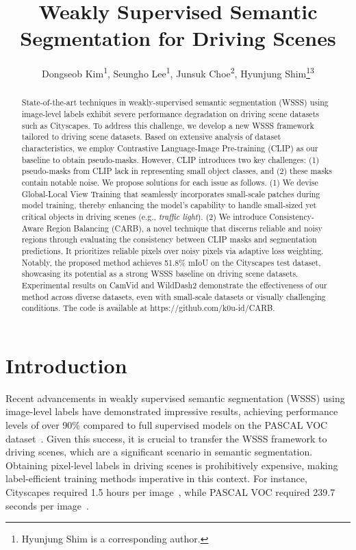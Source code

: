\documentclass[letterpaper]{article} %
\title{Weakly Supervised Semantic Segmentation for Driving Scenes}
\author{
    Dongseob Kim\equalcontrib\textsuperscript{\rm 1}, 
    Seungho Lee\equalcontrib\textsuperscript{\rm 1},
    Junsuk Choe\textsuperscript{\rm 2},
    Hyunjung Shim\thanks{Hyunjung Shim is a corresponding author.}\textsuperscript{\rm 3}
}
\def\eg{e.g.} \def\Eg{E.g.}
\begin{document}
\maketitle

\begin{abstract}
State-of-the-art techniques in weakly-supervised semantic segmentation (WSSS) using image-level labels exhibit severe performance degradation on driving scene datasets such as Cityscapes. To address this challenge, we develop a new WSSS framework tailored to driving scene datasets. Based on extensive analysis of dataset characteristics, we employ Contrastive Language-Image Pre-training (CLIP) as our baseline to obtain pseudo-masks. However, CLIP introduces two key challenges: (1) pseudo-masks from CLIP lack in representing small object classes, and (2) these masks contain notable noise. We propose solutions for each issue as follows. (1) We devise Global-Local View Training that seamlessly incorporates small-scale patches during model training, thereby enhancing the model's capability to handle small-sized yet critical objects in driving scenes (\eg, \textit{traffic light}). (2) We introduce Consistency-Aware Region Balancing (CARB), a novel technique that discerns reliable and noisy regions through evaluating the consistency between CLIP masks and segmentation predictions. It prioritizes reliable pixels over noisy pixels via adaptive loss weighting. Notably, the proposed method achieves 51.8\% mIoU on the Cityscapes test dataset, showcasing its potential as a strong WSSS baseline on driving scene datasets. Experimental results on CamVid and WildDash2 demonstrate the effectiveness of our method across diverse datasets, even with small-scale datasets or visually challenging conditions. The code is available at https://github.com/k0u-id/CARB.
\end{abstract}

\section{Introduction}

Recent advancements in weakly supervised semantic segmentation (WSSS) using image-level labels have demonstrated impressive results, achieving performance levels of over 90\% compared to full supervised models on the PASCAL VOC dataset~\cite{lee2022threshold,yoon2022adversarial}. Given this success, it is crucial to transfer the WSSS framework to driving scenes, which are a significant scenario in semantic segmentation. Obtaining pixel-level labels in driving scenes is prohibitively expensive, making label-efficient training methods imperative in this context. For instance, Cityscapes required 1.5 hours per image~\cite{cordts2016cityscapes}, while PASCAL VOC required 239.7 seconds per image~\cite{bearman2016s}.
\end{document}
